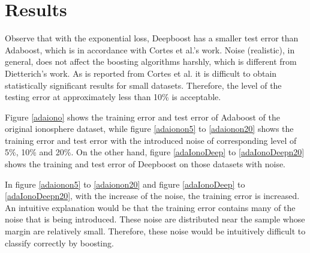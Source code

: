 \section{Results}

Observe that with the exponential loss, Deepboost has a smaller test error than Adaboost, which is in accordance with Cortes et al.’s work\cite{cortes2014deep}.
Noise (realistic), in general, does not affect the boosting algorithms harshly, which is different from Dietterich’s work\cite{dietterich2000experimental}.
As is reported from Cortes et al. it is difficult to obtain statistically significant results for small datasets.
Therefore, the level of the testing error at approximately less than 10\% is acceptable.

Figure \ref{adaiono} shows the training error and test error of Adaboost of the original ionosphere dataset,
while figure \ref{adaionon5} to \ref{adaionon20} shows the training error and test error with the introduced noise of
corresponding level of 5\%, 10\% and 20\%. On the other hand, figure \ref{adaIonoDeep} to \ref{adaIonoDeepn20} shows the training
and test error of Deepboost on those datasets with noise.

In figure \ref{adaionon5} to \ref{adaionon20} and figure \ref{adaIonoDeep} to \ref{adaIonoDeepn20},
with the increase of the noise, the training error is increased.
An intuitive explanation would be that the training error contains many of the noise that is being introduced.
These noise are distributed near the sample whose margin are relatively small.
Therefore, these noise would be intuitively difficult to classify correctly by boosting.
